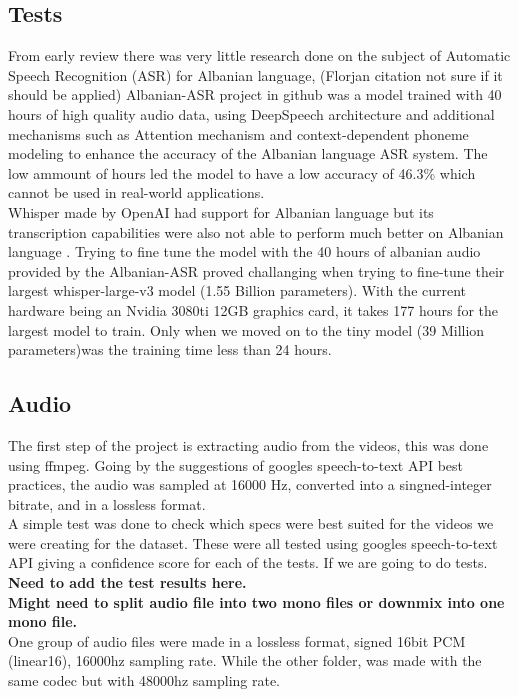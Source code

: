 \documentclass[12pt]{article}
\begin{document}
\subsection{Tests}
From early review there was very little research done on the subject of Automatic Speech Recognition (ASR) for Albanian language, (Florjan citation not sure if it should be applied) Albanian-ASR project in github was a model trained with 40 hours of high quality audio data, using DeepSpeech architecture and additional mechanisms such as Attention mechanism and context-dependent phoneme modeling to enhance the accuracy of the Albanian language ASR system. The low ammount of hours led the model to have a low accuracy of 46.3\% which cannot be used in real-world applications.\\
Whisper made by OpenAI had support for Albanian language but its transcription capabilities were also not able to perform much better on Albanian language \cite{openai_whisper}. Trying to fine tune the model with the 40 hours of albanian audio provided by the Albanian-ASR proved challanging when trying to fine-tune their largest whisper-large-v3 model (1.55 Billion parameters). With the current hardware being an Nvidia 3080ti 12GB graphics card, it takes 177 hours for the largest model to train. Only when we moved on to the tiny model (39 Million parameters)was the training time less than 24 hours. 
\subsection{Audio}
The first step of the project is extracting audio from the videos, this was done using ffmpeg. Going by the suggestions of googles speech-to-text API best practices, the audio was sampled at 16000 Hz, converted into a singned-integer bitrate, and in a lossless format.\\
A simple test was done to check which specs were best suited for the videos we were creating for the dataset. These were all tested using googles speech-to-text API giving a confidence score for each of the tests. If we are going to do tests.\\  \textbf{Need to add the test results here. \\ Might need to split audio file into two mono files or downmix into one mono file.}
\\
One group of audio files were made in a lossless format, signed 16bit PCM (linear16), 16000hz sampling rate. While the other folder, was made with the same codec but with 48000hz sampling rate.  
\\
\end{document}
